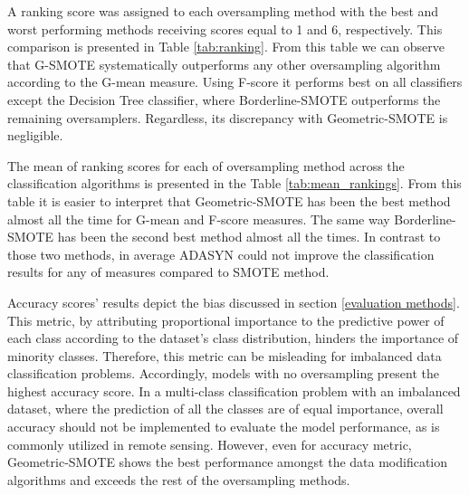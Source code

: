 \documentclass[parskip=full]{scrartcl}
\begin{document}
A ranking score was assigned to each oversampling method with the best and worst
performing methods receiving scores equal to 1 and 6, respectively. This
comparison is presented in Table \ref{tab:ranking}. From this table we can
observe that G-SMOTE systematically outperforms any other oversampling algorithm
according to the G-mean measure. Using F-score it performs best on all
classifiers except the Decision Tree classifier, where Borderline-SMOTE
outperforms the remaining oversamplers. Regardless, its discrepancy with
Geometric-SMOTE is negligible.


The mean of ranking scores for each of oversampling method across the
classification algorithms is presented in the Table \ref{tab:mean_rankings}.
From this table it is easier to interpret that Geometric-SMOTE has been the best
method almost all the time for G-mean and F-score measures. The same way
Borderline-SMOTE has been the second best method almost all the times. In
contrast to those two methods, in average ADASYN could not improve the
classification results for any of measures compared to SMOTE method.

Accuracy scores' results depict the bias discussed in section \ref{evaluation
methods}. This metric, by attributing proportional importance to the predictive
power of each class according to the dataset's class distribution, hinders the
importance of minority classes. Therefore, this metric can be misleading for
imbalanced data classification problems. Accordingly, models with no
oversampling present the highest accuracy score. In a multi-class classification
problem with an imbalanced dataset, where the prediction of all the classes are
of equal importance, overall accuracy should not be implemented to evaluate the
model performance, as is commonly utilized in remote sensing. However, even for
accuracy metric, Geometric-SMOTE shows the best performance amongst the data
modification algorithms and exceeds the rest of the oversampling methods.
\end{document}
